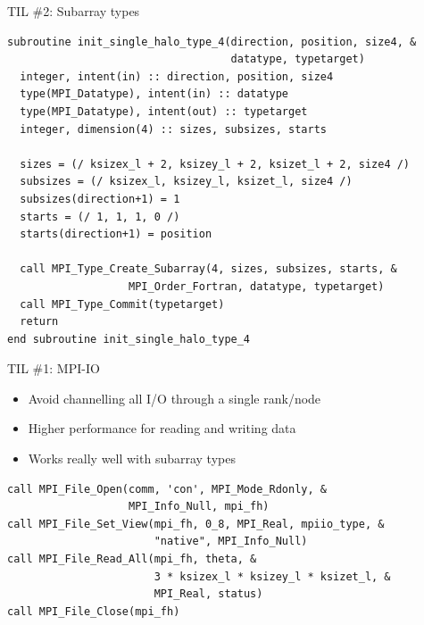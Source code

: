 \documentclass[handout]{beamer}
\begin{document}
\begin{frame}[fragile]{TIL \#2: Subarray types}
  \noindent\small
  	\begin{verbatim}
subroutine init_single_halo_type_4(direction, position, size4, &
                                   datatype, typetarget)
  integer, intent(in) :: direction, position, size4
  type(MPI_Datatype), intent(in) :: datatype
  type(MPI_Datatype), intent(out) :: typetarget
  integer, dimension(4) :: sizes, subsizes, starts

  sizes = (/ ksizex_l + 2, ksizey_l + 2, ksizet_l + 2, size4 /)
  subsizes = (/ ksizex_l, ksizey_l, ksizet_l, size4 /)
  subsizes(direction+1) = 1
  starts = (/ 1, 1, 1, 0 /)
  starts(direction+1) = position

  call MPI_Type_Create_Subarray(4, sizes, subsizes, starts, &
                   MPI_Order_Fortran, datatype, typetarget)
  call MPI_Type_Commit(typetarget)
  return
end subroutine init_single_halo_type_4
\end{verbatim}

	
\end{frame}

\begin{frame}[fragile]{TIL \#1: MPI-IO}
	\begin{itemize}[<+->]
		\item Avoid channelling all I/O through a single rank/node
		\item Higher performance for reading and writing data
		\item Works really well with subarray types
	\end{itemize}\pause\small
	\begin{verbatim}
call MPI_File_Open(comm, 'con', MPI_Mode_Rdonly, &
                   MPI_Info_Null, mpi_fh)
call MPI_File_Set_View(mpi_fh, 0_8, MPI_Real, mpiio_type, &
                       "native", MPI_Info_Null)
call MPI_File_Read_All(mpi_fh, theta, &
                       3 * ksizex_l * ksizey_l * ksizet_l, &
                       MPI_Real, status)
call MPI_File_Close(mpi_fh)\end{verbatim}
\end{frame}
\end{document}
